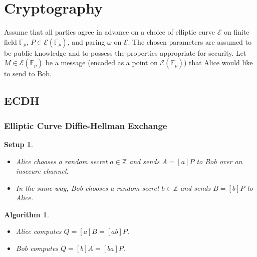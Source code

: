 \documentclass{beamer}
\newtheorem{algorithm}{Algorithm}
\newtheorem{setup}{Setup}
\begin{document}
    \section{Cryptography}
    \begin{frame}
        Assume that all parties agree in advance on a choice of elliptic curve
        \(\mathcal{E}\) on finite field \(\mathbb{F}_p\),
        \(P \in \mathcal{E}(\mathbb{F}_p)\), and paring \(\omega\)
        on \(\mathcal{E}\).
        \vfill
        The chosen parameters are assumed to be public knowledge and to
        possess the properties appropriate for security.
        \vfill
        Let \(M \in \mathcal{E}(\mathbb{F}_p)\) be a message (encoded as
        a point on \(\mathcal{E}(\mathbb{F}_p)\))
        that Alice would like to send to Bob.
    \end{frame}

    \subsection{ECDH}
    \begin{frame}
        \frametitle{Elliptic Curve Diffie-Hellman Exchange}
        \begin{setup}
            \begin{itemize}
                \item Alice chooses a random secret \(a \in \mathbb{Z}\) and
                    sends \(A = [a]P\) to Bob over an insecure channel.
                \item In the same way, Bob chooses a random secret
                \(b \in \mathbb{Z}\) and sends \(B = [b]P\) to Alice.
            \end{itemize}
        \end{setup}
        \vfill
        \begin{algorithm}
            \begin{itemize}
                \item Alice computes \(Q = [a]B = [ab]P\).
                \item Bob computes \(Q = [b]A = [ba]P\).
            \end{itemize}
        \end{algorithm}
    \end{frame}
\end{document}
